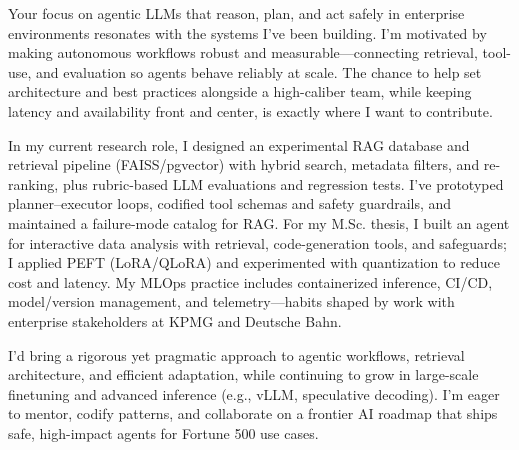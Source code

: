 Your focus on agentic LLMs that reason, plan, and act safely in enterprise environments resonates with the systems I’ve been building. I’m motivated by making autonomous workflows robust and measurable—connecting retrieval, tool-use, and evaluation so agents behave reliably at scale. The chance to help set architecture and best practices alongside a high-caliber team, while keeping latency and availability front and center, is exactly where I want to contribute.

In my current research role, I designed an experimental RAG database and retrieval pipeline (FAISS/pgvector) with hybrid search, metadata filters, and re-ranking, plus rubric-based LLM evaluations and regression tests. I’ve prototyped planner–executor loops, codified tool schemas and safety guardrails, and maintained a failure-mode catalog for RAG. For my M.Sc. thesis, I built an agent for interactive data analysis with retrieval, code-generation tools, and safeguards; I applied PEFT (LoRA/QLoRA) and experimented with quantization to reduce cost and latency. My MLOps practice includes containerized inference, CI/CD, model/version management, and telemetry—habits shaped by work with enterprise stakeholders at KPMG and Deutsche Bahn.

I’d bring a rigorous yet pragmatic approach to agentic workflows, retrieval architecture, and efficient adaptation, while continuing to grow in large-scale finetuning and advanced inference (e.g., vLLM, speculative decoding). I’m eager to mentor, codify patterns, and collaborate on a frontier AI roadmap that ships safe, high-impact agents for Fortune 500 use cases.